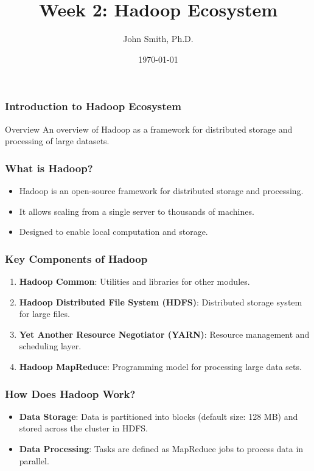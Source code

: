 \documentclass[aspectratio=169]{beamer}
\title[Chapter: Hadoop Ecosystem]{Week 2: Hadoop Ecosystem}
\author[J. Smith]{John Smith, Ph.D.}
\institute[University Name]{
  Department of Computer Science\\
  University Name\\
  \vspace{0.3cm}
  Email: email@university.edu\\
  Website: www.university.edu
}
\date{\today}
\begin{document}
\frame{\titlepage}

\begin{frame}[fragile]
    \frametitle{Introduction to Hadoop Ecosystem}
    \begin{block}{Overview}
        An overview of Hadoop as a framework for distributed storage and processing of large datasets.
    \end{block}
\end{frame}

\begin{frame}[fragile]
    \frametitle{What is Hadoop?}
    \begin{itemize}
        \item Hadoop is an open-source framework for distributed storage and processing.
        \item It allows scaling from a single server to thousands of machines.
        \item Designed to enable local computation and storage.
    \end{itemize}
\end{frame}

\begin{frame}[fragile]
    \frametitle{Key Components of Hadoop}
    \begin{enumerate}
        \item \textbf{Hadoop Common}: Utilities and libraries for other modules.
        \item \textbf{Hadoop Distributed File System (HDFS)}: Distributed storage system for large files.
        \item \textbf{Yet Another Resource Negotiator (YARN)}: Resource management and scheduling layer.
        \item \textbf{Hadoop MapReduce}: Programming model for processing large data sets.
    \end{enumerate}
\end{frame}

\begin{frame}[fragile]
    \frametitle{How Does Hadoop Work?}
    \begin{itemize}
        \item \textbf{Data Storage}: Data is partitioned into blocks (default size: 128 MB) and stored across the cluster in HDFS.
        \item \textbf{Data Processing}: Tasks are defined as MapReduce jobs to process data in parallel.
    \end{itemize}
\end{frame}
\end{document}
